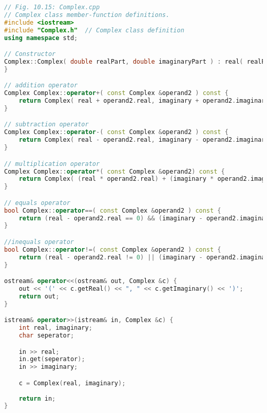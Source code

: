 \documentclass[letterpaper, 11pt]{article}
\begin{document}
\begin{lstlisting}[language=c++, caption=Complex.cpp]
// Fig. 10.15: Complex.cpp
// Complex class member-function definitions.
#include <iostream>
#include "Complex.h"  // Complex class definition
using namespace std;

// Constructor
Complex::Complex( double realPart, double imaginaryPart ) : real( realPart ), imaginary( imaginaryPart ) {
}

// addition operator
Complex Complex::operator+( const Complex &operand2 ) const {
    return Complex( real + operand2.real, imaginary + operand2.imaginary );
}

// subtraction operator
Complex Complex::operator-( const Complex &operand2 ) const {
    return Complex( real - operand2.real, imaginary - operand2.imaginary );
}

// multiplication operator
Complex Complex::operator*( const Complex &operand2) const {
    return Complex( (real * operand2.real) + (imaginary * operand2.imaginary), (real * operand2.imaginary) + (imaginary * operand2.real));
}

// equals operator
bool Complex::operator==( const Complex &operand2 ) const {
    return (real - operand2.real == 0) && (imaginary - operand2.imaginary == 0);
}

//inequals operator
bool Complex::operator!=( const Complex &operand2 ) const {
    return (real - operand2.real != 0) || (imaginary - operand2.imaginary != 0);
}

ostream& operator<<(ostream& out, Complex &c) {
    out << '(' << c.getReal() << ", " << c.getImaginary() << ')';
    return out;
}

istream& operator>>(istream& in, Complex &c) {
    int real, imaginary;
    char seperator;

    in >> real;
    in.get(seperator);
    in >> imaginary;

    c = Complex(real, imaginary);
    
    return in;
}
\end{lstlisting}
\end{document}
